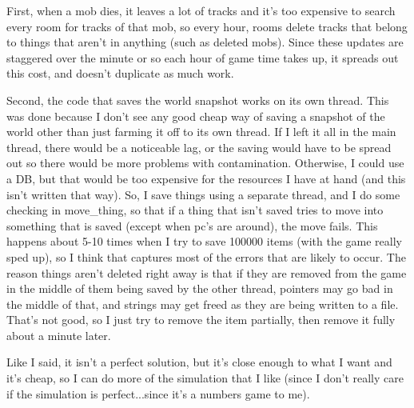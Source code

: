 First, when a mob
dies, it leaves a lot of tracks and it's too expensive to search every
room for tracks of that mob, so every hour, rooms delete tracks that
belong to things that aren't in anything (such as deleted mobs). Since
these updates are staggered over the minute or so each hour of game
time takes up, it spreads out this cost, and doesn't duplicate as much
work.

Second, the code that saves the world snapshot works on its own
thread. This was done because I don't see any good cheap way of saving
a snapshot of the world other than just farming it off to its own
thread. If I left it all in the main thread, there would be a
noticeable lag, or the saving would have to be spread out so
there would be more problems with contamination. Otherwise, I could
use a DB, but that would be too expensive for the resources I have at
hand (and this isn't written that way). So, I save things using a
separate thread, and I do some checking in move\_thing, so that if a
thing that isn't saved tries to move into something that is saved
(except when pc's are around), the move fails. This happens about 5-10
times when I try to save 100000 items (with the game really sped up),
so I think that captures most of the errors that are likely to occur.
The reason things aren't deleted right away is that if they are 
removed from the game in the middle of them being saved by the other
thread, pointers may go bad in the middle of that, and strings may
get freed as they are being written to a file. That's not good, so
I just try to remove the item partially, then remove it fully about a
minute later.

Like I said, it isn't a perfect solution, but it's close enough to
what I want and it's cheap, so I can do more of the simulation that I
like (since I don't really care if the simulation is perfect...since
it's a numbers game to me).




